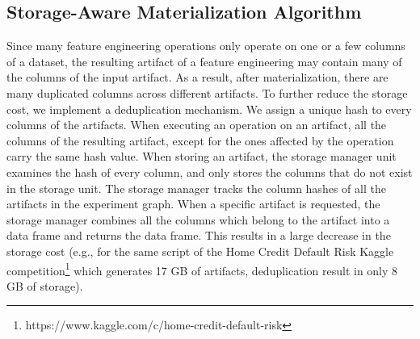 \subsection{Storage-Aware Materialization Algorithm}
Since many feature engineering operations only operate on one or a few columns of a dataset, the resulting artifact of a feature engineering may contain many of the columns of the input artifact.
As a result, after materialization, there are many duplicated columns across different artifacts.
To further reduce the storage cost, we implement a deduplication mechanism.
We assign a unique hash to every columns of the artifacts.
When executing an operation on an artifact, all the columns of the resulting artifact, except for the ones affected by the operation carry the same hash value.
When storing an artifact, the storage manager unit examines the hash of every column, and only stores the columns that do not exist in the storage unit.
The storage manager tracks the column hashes of all the artifacts in the experiment graph.
When a specific artifact is requested, the storage manager combines all the columns which belong to the artifact into a data frame and returns the data frame.
This results in a large decrease in the storage cost (e.g., for the same script of the Home Credit Default Risk Kaggle competition\footnote{https://www.kaggle.com/c/home-credit-default-risk} which generates 17 GB of artifacts, deduplication result in only 8 GB of storage).

